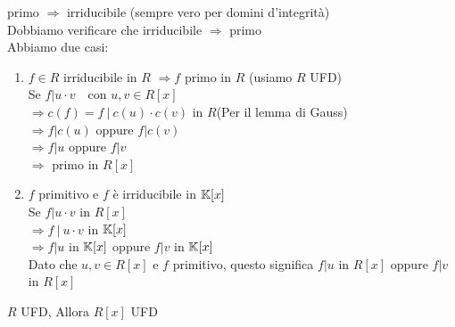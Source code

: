 \documentclass[12px]{article}
\begin{document}
\begin{dimo}
	primo $\Rightarrow $ irriducibile (sempre vero per domini d'integrità)\\
	Dobbiamo verificare che irriducibile  $ \Rightarrow $ primo\\
	Abbiamo due casi:
	\begin{enumerate}
		\item $f\in R$ irriducibile in  $R$  $ \Rightarrow f$ primo in $R$ \hfill (usiamo  $R$ UFD)\\
			Se $f | u\cdot v \ \ \ $ con  $u,v\in R[x]$\\
			 $ \Rightarrow c(f) = f \ | \ c(u)\cdot c(v)$ in $R$\hfill (Per il lemma di Gauss)\\
			 $ \Rightarrow f|c(u)$ oppure $f | c(v)$\\
			 $ \Rightarrow f| u$ oppure $f | v$\\
			 $\Rightarrow  $ primo in $R[x]$
		 \item  $f$ primitivo e $f$ è irriducibile in $\mathbb{K}[x]$\\
			 Se  $f | u\cdot v$ in  $R[x]$\\
			 $ \Rightarrow f \ | \ u\cdot v$ in $\mathbb{K}[x]$\\
			 $ \Rightarrow f | u $ in $\mathbb{K}[x]$ oppure $f | v$ in $\mathbb{K}[x]$\\
			 Dato che $u,v\in R[x]$ e  $f$ primitivo, questo significa $f | u$ in $R[x]$ oppure  $f | v$ in  $R[x]$
	\end{enumerate}

\end{dimo}
\begin{teo}
	$R$ UFD, Allora $R[x]$ UFD
\end{teo}
\end{document}
